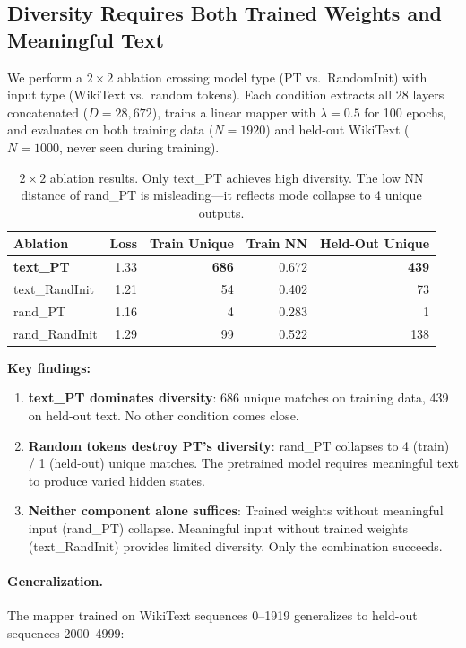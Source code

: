 \documentclass[11pt,a4paper]{article}
\begin{document}
\subsection{Diversity Requires Both Trained Weights and Meaningful Text}

We perform a $2 \times 2$ ablation crossing model type (PT vs.\ RandomInit) with input type (WikiText vs.\ random tokens).
Each condition extracts all 28 layers concatenated ($D = 28{,}672$), trains a linear mapper with $\lambda = 0.5$ for 100 epochs, and evaluates on both training data ($N = 1920$) and held-out WikiText ($N = 1000$, never seen during training).

\begin{table}[h]
\centering
\begin{tabular}{lrrrr}
\toprule
Ablation & Loss & Train Unique & Train NN & Held-Out Unique \\
\midrule
\textbf{text\_PT} & 1.33 & \textbf{686} & 0.672 & \textbf{439} \\
text\_RandInit & 1.21 & 54 & 0.402 & 73 \\
rand\_PT & 1.16 & 4 & 0.283 & 1 \\
rand\_RandInit & 1.29 & 99 & 0.522 & 138 \\
\bottomrule
\end{tabular}
\caption{$2 \times 2$ ablation results. Only text\_PT achieves high diversity. The low NN distance of rand\_PT is misleading---it reflects mode collapse to 4 unique outputs.}
\label{tab:ablation}
\end{table}

\textbf{Key findings:}
\begin{enumerate}[nosep]
    \item \textbf{text\_PT dominates diversity}: 686 unique matches on training data, 439 on held-out text. No other condition comes close.
    \item \textbf{Random tokens destroy PT's diversity}: rand\_PT collapses to 4 (train) / 1 (held-out) unique matches. The pretrained model requires meaningful text to produce varied hidden states.
    \item \textbf{Neither component alone suffices}: Trained weights without meaningful input (rand\_PT) collapse. Meaningful input without trained weights (text\_RandInit) provides limited diversity. Only the combination succeeds.
\end{enumerate}

\paragraph{Generalization.}
The mapper trained on WikiText sequences 0--1919 generalizes to held-out sequences 2000--4999:
\end{document}
